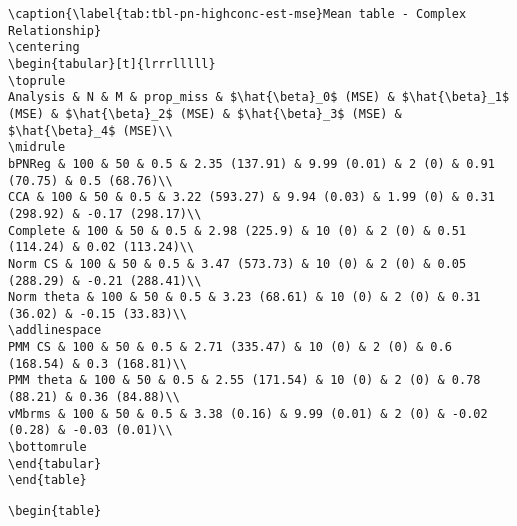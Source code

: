 \documentclass[
]{article}
\begin{document}
\begin{table}
\begin{minipage}[t]{\linewidth}
{\begin{verbatim}
\caption{\label{tab:tbl-pn-highconc-est-mse}Mean table - Complex Relationship}
\centering
\begin{tabular}[t]{lrrrlllll}
\toprule
Analysis & N & M & prop_miss & $\hat{\beta}_0$ (MSE) & $\hat{\beta}_1$ (MSE) & $\hat{\beta}_2$ (MSE) & $\hat{\beta}_3$ (MSE) & $\hat{\beta}_4$ (MSE)\\
\midrule
bPNReg & 100 & 50 & 0.5 & 2.35 (137.91) & 9.99 (0.01) & 2 (0) & 0.91 (70.75) & 0.5 (68.76)\\
CCA & 100 & 50 & 0.5 & 3.22 (593.27) & 9.94 (0.03) & 1.99 (0) & 0.31 (298.92) & -0.17 (298.17)\\
Complete & 100 & 50 & 0.5 & 2.98 (225.9) & 10 (0) & 2 (0) & 0.51 (114.24) & 0.02 (113.24)\\
Norm CS & 100 & 50 & 0.5 & 3.47 (573.73) & 10 (0) & 2 (0) & 0.05 (288.29) & -0.21 (288.41)\\
Norm theta & 100 & 50 & 0.5 & 3.23 (68.61) & 10 (0) & 2 (0) & 0.31 (36.02) & -0.15 (33.83)\\
\addlinespace
PMM CS & 100 & 50 & 0.5 & 2.71 (335.47) & 10 (0) & 2 (0) & 0.6 (168.54) & 0.3 (168.81)\\
PMM theta & 100 & 50 & 0.5 & 2.55 (171.54) & 10 (0) & 2 (0) & 0.78 (88.21) & 0.36 (84.88)\\
vMbrms & 100 & 50 & 0.5 & 3.38 (0.16) & 9.99 (0.01) & 2 (0) & -0.02 (0.28) & -0.03 (0.01)\\
\bottomrule
\end{tabular}
\end{table}
\end{verbatim}

}

\end{minipage}%
\newline
\begin{minipage}[t]{\linewidth}

{\centering 

\begin{verbatim}
\begin{table}


\end{verbatim}}
\end{minipage}
\end{table}
\end{document}
